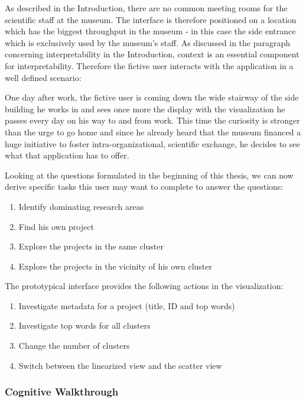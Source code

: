 As described in the Introduction, there are no common meeting rooms for the scientific staff at the museum. The interface is therefore positioned on a location which has the biggest throughput in the museum - in this case the side entrance which is exclusively used by the museum's staff.
As discussed in the paragraph concerning interpretability in the Introduction, context is an essential component for interpretability. Therefore the fictive user interacts with the application in a well defined scenario:

	 One day after work, the fictive user is coming down the wide stairway of the side building he works in and sees once more the display with the visualization he passes every day on his way to and from work. This time the curiosity is stronger than the urge to go home and since he already heard that the museum financed a huge initiative to foster intra-organizational, scientific exchange, he decides to see what that application has to offer.


Looking at the questions formulated in the beginning of this thesis, we can now derive specific tasks this user may want to complete to answer the questions:
\begin{enumerate}
	\item Identify dominating research areas
	\item Find his own project
	\item Explore the projects in the same cluster
	\item Explore the projects in the vicinity of his own cluster
\end{enumerate}

The prototypical interface provides the following actions in the visualization:
\begin{enumerate}
	\item Investigate metadata for a project (title, ID and top words)
	\item Investigate top words for all clusters
	\item Change the number of clusters
	\item Switch between the linearized view and the scatter view
\end{enumerate}



\subsubsection{Cognitive Walkthrough} 

